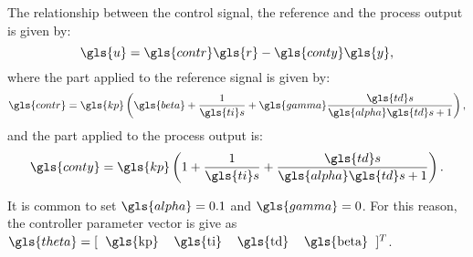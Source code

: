 %
The relationship between the control signal, the reference and the process output is given by:
%
\begin{equation}  %
	\gls{u} = \gls{contr} \gls{r} - \gls{conty} \gls{y},
	\label{us}
\end{equation}
%
where the part applied to the reference signal is given by:
%
\begin{equation}  %
	\gls{contr}=  \gls{kp}\left({\gls{beta} + \frac{1}{\gls{ti} s}+ \gls{gamma} \frac{\gls{td} s}{\gls{alpha} \gls{td} s +1}}\right),
	\label{eq:cr}
\end{equation}
%
and the part applied to the process output is:
%
\begin{equation}  %
	\gls{conty}=  \gls{kp}\left({1 + \frac{1}{\gls{ti} s}+\frac{\gls{td} s}{\gls{alpha} \gls{td} s +1} }\right).
	\label{eq:cy}
\end{equation}

It is common to set $\gls{alpha}=0.1$ and $\gls{gamma}=0$. For this reason, the controller parameter vector is give as $\gls{theta}=[\begin{tabular}{cccc} \gls{kp} & \gls{ti} & \gls{td} &\gls{beta} \end{tabular}]^T$.

%
%
%

